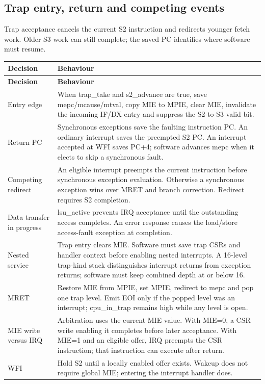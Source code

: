 \documentclass[11pt]{article}
\begin{document}
\subsection{Trap entry, return and competing events}
\noindent Trap acceptance cancels the current S2 instruction and redirects younger fetch work. Older S3 work can still complete; the saved PC identifies where software must resume.\par\medskip
{\small
\begin{longtable}{@{}L{0.2500\dimexpr\linewidth-12pt\relax}L{0.7500\dimexpr\linewidth-12pt\relax}@{}}
\toprule
\textbf{Decision} & \textbf{Behaviour} \\ \midrule
\endfirsthead
\toprule
\textbf{Decision} & \textbf{Behaviour} \\ \midrule
\endhead
Entry edge & When trap\_take and s2\_advance are true, save mepc/mcause/mtval, copy MIE to MPIE, clear MIE, invalidate the incoming IF/DX entry and suppress the S2-to-S3 valid bit. \\ \addlinespace[3pt]
Return PC & Synchronous exceptions save the faulting instruction PC. An ordinary interrupt saves the preempted S2 PC. An interrupt accepted at WFI saves PC+4; software advances mepc when it elects to skip a synchronous fault. \\ \addlinespace[3pt]
Competing redirect & An eligible interrupt preempts the current instruction before synchronous exception evaluation. Otherwise a synchronous exception wins over MRET and branch correction. Redirect requires S2 completion. \\ \addlinespace[3pt]
Data transfer in progress & lsu\_active prevents IRQ acceptance until the outstanding access completes. An error response causes the load/store access-fault exception at completion. \\ \addlinespace[3pt]
Nested service & Trap entry clears MIE. Software must save trap CSRs and handler context before enabling nested interrupts. A 16-level trap-kind stack distinguishes interrupt returns from exception returns; software must keep combined depth at or below 16. \\ \addlinespace[3pt]
MRET & Restore MIE from MPIE, set MPIE, redirect to mepc and pop one trap level. Emit EOI only if the popped level was an interrupt; cpu\_in\_trap remains high while any level is open. \\ \addlinespace[3pt]
MIE write versus IRQ & Arbitration uses the current MIE value. With MIE=0, a CSR write enabling it completes before later acceptance. With MIE=1 and an eligible offer, IRQ preempts the CSR instruction; that instruction can execute after return. \\ \addlinespace[3pt]
WFI & Hold S2 until a locally enabled offer exists. Wakeup does not require global MIE; entering the interrupt handler does. \\*
\bottomrule\end{longtable}}
\end{document}
